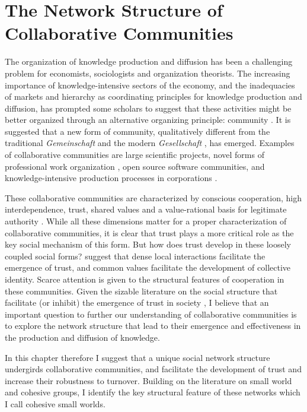 \chapter{The Network Structure of Collaborative Communities}
\label{collaborative_communities}

The organization of knowledge production and diffusion has been a challenging problem for economists, sociologists and organization theorists. The increasing importance of knowledge-intensive sectors of the economy, and the inadequacies of markets and hierarchy as coordinating principles for knowledge production and diffusion, has prompted some scholars to suggest that these activities might be better organized through an alternative organizing principle: community \citep{adler:2001}. It is suggested that a new form of community, qualitatively different from the traditional \emph{Gemeinschaft} and the modern \emph{Gesellschaft} \citep{tonnies:1974}, has emerged.  Examples of collaborative communities are large scientific projects, novel forms of professional work organization \citep*{adler:2008}, open source software communities, and knowledge-intensive production processes in corporations \citep{adler:2006}.

These collaborative communities are characterized by conscious cooperation, high interdependence, trust, shared values and a value-rational basis for legitimate authority \citep{adler:2006,adler:2008}. While all these dimensions matter for a proper characterization of collaborative communities, it is clear that trust plays a more critical role as the key social mechanism of this form. But how does trust develop in these loosely coupled social forms? \citet{adler:2006} suggest that dense local interactions facilitate the emergence of trust, and common values facilitate the development of collective identity.  Scarce attention is given to the structural features of cooperation in these communities. Given the sizable literature on the social structure that facilitate (or inhibit) the emergence of trust in society \citep{granovetter:1985,coleman:1988,moody:2003}, I believe that an important question to further our understanding of collaborative communities is to explore the network structure that lead to their emergence and effectiveness in the production and diffusion of knowledge.

In this chapter therefore I suggest that a unique social network structure undergirds collaborative communities, and facilitate the development of trust and increase their robustness to turnover. Building on the literature on small world and cohesive groups, I identify the key structural feature of these networks which I call cohesive small worlds.

